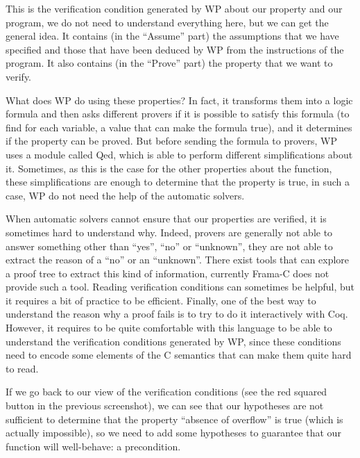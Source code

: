 

This is the verification condition generated by WP about our property and our
program, we do not need to understand everything here, but we can get the
general idea. It contains (in the ``Assume'' part) the assumptions that
we have specified and those that have been deduced by WP from the
instructions of the program. It also contains (in the ``Prove'' part)
the property that we want to verify.



What does WP do using these properties? In fact, it transforms them
into a logic formula and then asks different provers if it is
possible to satisfy this formula (to find for each variable, a value
that can make the formula true), and it determines if the property can
be proved. But before sending the formula to provers, WP uses a module
called Qed, which is able to perform different simplifications about it.
Sometimes, as this is the case for the other properties about the
 function, these simplifications are enough to determine that
the property is true, in such a case, WP do not need the help of the
automatic solvers.



When automatic solvers cannot ensure that our properties are verified,
it is sometimes hard to understand why. Indeed, provers are generally
not able to answer something other than ``yes'', ``no'' or ``unknown'',
they are not able to extract the reason of a ``no'' or an ``unknown''.
There exist tools that can explore a proof tree to extract this kind of
information, currently Frama-C does not provide such a tool. Reading
verification conditions can sometimes be helpful, but it requires a bit of
practice to be efficient. Finally, one of the best way to understand the reason
why a proof fails is to try to do it interactively with Coq. However, it
requires to be quite comfortable with this language to be able to understand
the verification conditions generated by WP, since these conditions
need to encode some elements of the C semantics that can make them quite
hard to read.



If we go back to our view of the verification conditions (see the red squared
button in the previous screenshot), we can see that our hypotheses are not
sufficient to determine that the property ``absence of overflow'' is true (which
is actually impossible), so we need to add some hypotheses to
guarantee that our function will well-behave: a precondition.



